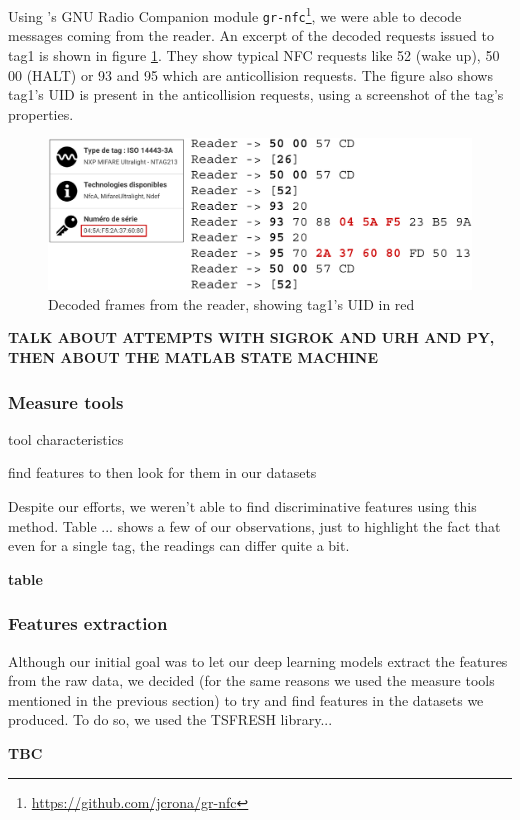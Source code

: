 Using \textcite{rona_sniffing_2017}'s GNU Radio Companion module \texttt{gr-nfc}\footnote{\url{https://github.com/jcrona/gr-nfc}}, we were able to decode messages coming from the reader. An excerpt of the decoded requests issued to tag1 is shown in figure \ref{fig:decoded}. They show typical NFC requests like 52 (wake up), 50 00 (HALT) or 93 and 95 which are anticollision requests. The figure also shows tag1's UID is present in the anticollision requests, using a screenshot of the tag's properties.

\begin{figure}[htbp!]
  \centering
  \includegraphics[scale=0.35]{figures/data_decoded-frames_app.png}
  \caption{Decoded frames from the reader, showing tag1's UID in red}
  \label{fig:decoded}
\end{figure}


\textbf{TALK ABOUT ATTEMPTS WITH SIGROK AND URH AND PY, THEN ABOUT THE MATLAB STATE MACHINE}

\subsubsection{Measure tools}

tool characteristics

find features to then look for them in our datasets

Despite our efforts, we weren't able to find discriminative features using this method. Table ... shows a few of our observations, just to highlight the fact that even for a single tag, the readings can differ quite a bit.

\textbf{table}

\subsubsection{Features extraction}

Although our initial goal was to let our deep learning models extract the features from the raw data, we decided (for the same reasons we used the measure tools mentioned in the previous section) to try and find features in the datasets we produced. To do so, we used the TSFRESH library...

\textbf{TBC}

